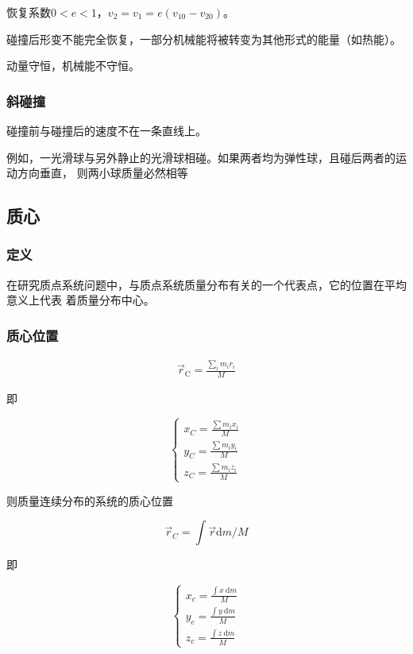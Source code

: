 \documentclass[
	12pt, %
	a4paper, %
]{myLegrandOrangeBook}
\newcommand{\rmd}{\mathrm{d}}
\begin{document}
恢复系数\(0<e<1\)，\(v_2=v_1=e\left(v_{10} - v_{20}\right)\)。

碰撞后形变不能完全恢复，一部分机械能将被转变为其他形式的能量（如热能）。

动量守恒，机械能不守恒。

\subsubsection{斜碰撞}

碰撞前与碰撞后的速度不在一条直线上。

例如，一光滑球与另外静止的光滑球相碰。如果两者均为弹性球，且碰后两者的运动方向垂直，
则两小球质量必然相等

\subsection{质心}

\subsubsection{定义}

在研究质点系统问题中，与质点系统质量分布有关的一个代表点，它的位置在平均意义上代表
着质量分布中心。

\subsubsection{质心位置}

\begin{align}
    \overrightarrow{r}_{\mathrm{C}} = \frac{\sum_{i} m_ir_i}{M}
\end{align}

即

$$
    \left\{\begin{array}{l}
    x_C=\frac{\sum m_i x_i}{M} \\
    y_C=\frac{\sum m_i y_i}{M} \\
    z_C=\frac{\sum m_i z_i}{M}
    \end{array}\right.
$$

则质量连续分布的系统的质心位置

$$
    \overrightarrow{r}_C=\int \overrightarrow{r} \rmd m / M
$$

即

$$
    \left\{\begin{array}{l}
        x_c=\frac{\int x \mathrm{~d} m}{M} \\
        y_c=\frac{\int y \mathrm{~d} m}{M} \\
        z_c=\frac{\int z \mathrm{~d} m}{M}
    \end{array}\right.
$$
\end{document}
